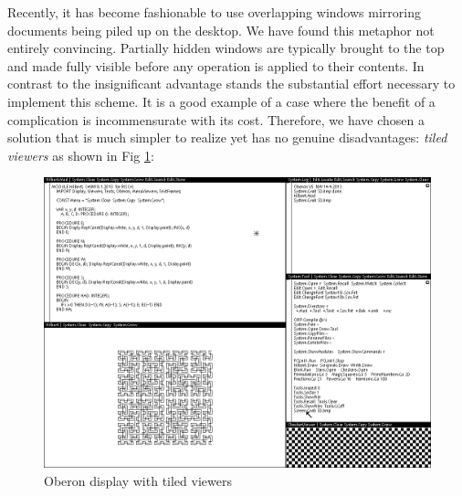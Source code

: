 Recently, it has become fashionable to use overlapping windows mirroring documents being
piled up on the desktop. We have found this metaphor not entirely convincing. Partially
hidden windows are typically brought to the top and made fully visible before any operation
is applied to their contents. In contrast to the insignificant advantage stands the
substantial effort necessary to implement this scheme. It is a good example of a case
where the benefit of a complication is incommensurate with its cost. Therefore, we have
chosen a solution that is much simpler to realize yet has no genuine disadvantages:
\emph{tiled viewers} as shown in Fig \ref{fig:viewers}:
\begin{figure}[h!]
  \centering
  \includegraphics[width=.75\textwidth]{i/1.png}
  \caption{Oberon display with tiled viewers}
  \label{fig:viewers}
\end{figure}

